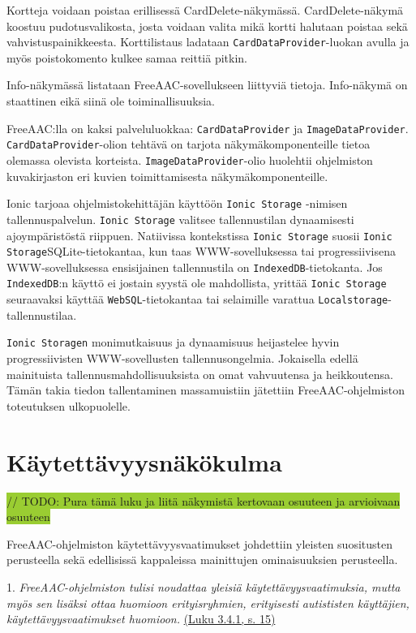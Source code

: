 \documentclass[utf8]{gradu3}
\begin{document}
Kortteja voidaan poistaa erillisessä CardDelete-näkymässä. CardDelete-näkymä koostuu pudotusvalikosta, josta voidaan valita mikä kortti halutaan poistaa sekä vahvistuspainikkeesta. Korttilistaus ladataan \texttt{CardDataProvider}-luokan avulla ja myös poistokomento kulkee samaa reittiä pitkin.

Info-näkymässä listataan FreeAAC-sovellukseen liittyviä tietoja. Info-näkymä on staattinen eikä siinä ole toiminallisuuksia.

FreeAAC:lla on kaksi palveluluokkaa: \texttt{CardDataProvider} ja \texttt{ImageDataProvider}. \texttt{CardDataProvider}-olion tehtävä on tarjota näkymäkomponenteille tietoa olemassa olevista korteista. \texttt{ImageDataProvider}-olio huolehtii ohjelmiston kuvakirjaston eri kuvien toimittamisesta näkymäkomponenteille.

Ionic tarjoaa ohjelmistokehittäjän käyttöön \texttt{Ionic Storage} -nimisen tallennuspalvelun. \texttt{Ionic Storage} valitsee tallennustilan dynaamisesti ajoympäristöstä riippuen. Natiivissa kontekstissa \texttt{Ionic Storage} suosii \texttt{Ionic Storage}SQLite-tietokantaa, kun taas WWW-sovelluksessa tai progressiivisena WWW-sovelluksessa ensisijainen tallennustila on \texttt{IndexedDB}-tietokanta. Jos \texttt{IndexedDB}:n käyttö ei jostain syystä ole mahdollista, yrittää \texttt{Ionic Storage} seuraavaksi käyttää \texttt{WebSQL}-tietokantaa tai selaimille varattua \texttt{Localstorage}-tallennustilaa.

\texttt{Ionic Storagen} monimutkaisuus ja dynaamisuus heijastelee hyvin progressiivisten WWW-sovellusten tallennusongelmia. Jokaisella edellä mainituista tallennusmahdollisuuksista on omat vahvuutensa ja heikkoutensa. Tämän takia tiedon tallentaminen massamuistiin jätettiin FreeAAC-ohjelmiston toteutuksen ulkopuolelle.

\section{Käytettävyysnäkökulma}

\colorbox{YellowGreen}{// TODO: Pura tämä luku ja liitä näkymistä kertovaan osuuteen ja arvioivaan osuuteen}

FreeAAC-ohjelmiston käytettävyysvaatimukset johdettiin yleisten suositusten perusteella sekä edellisissä kappaleissa mainittujen ominaisuuksien perusteella.

1. \textit{FreeAAC-ohjelmiston tulisi noudattaa yleisiä käytettävyysvaatimuksia, mutta myös sen lisäksi ottaa huomioon erityisryhmien, erityisesti autististen käyttäjien, käytettävyysvaatimukset huomioon.} \hyperref[general-usability-requirements]{(Luku 3.4.1, s. 15)}
\end{document}
